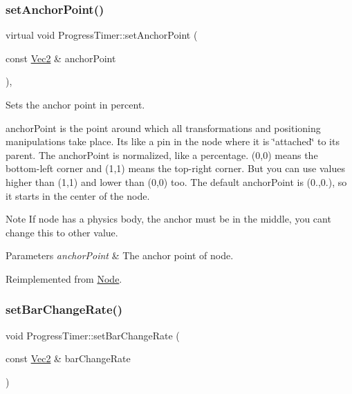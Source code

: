 \subsubsection{\texorpdfstring{set\+Anchor\+Point()}{setAnchorPoint()}\hspace{0.1cm}{\footnotesize\ttfamily [2/2]}}
{\footnotesize\ttfamily virtual void Progress\+Timer\+::set\+Anchor\+Point (\begin{DoxyParamCaption}\item[{const \hyperlink{classVec2}{Vec2} \&}]{anchor\+Point }\end{DoxyParamCaption})\hspace{0.3cm}{\ttfamily [override]}, {\ttfamily [virtual]}}

Sets the anchor point in percent.

anchor\+Point is the point around which all transformations and positioning manipulations take place. It\textquotesingle{}s like a pin in the node where it is \char`\"{}attached\char`\"{} to its parent. The anchor\+Point is normalized, like a percentage. (0,0) means the bottom-\/left corner and (1,1) means the top-\/right corner. But you can use values higher than (1,1) and lower than (0,0) too. The default anchor\+Point is (0.,0.), so it starts in the center of the node. \begin{DoxyNote}{Note}
If node has a physics body, the anchor must be in the middle, you can\textquotesingle{}t change this to other value.
\end{DoxyNote}

\begin{DoxyParams}{Parameters}
{\em anchor\+Point} & The anchor point of node. \\
\hline
\end{DoxyParams}


Reimplemented from \hyperlink{classNode_a4dd45cb48a51df7c257675f527e3f277}{Node}.

\mbox{\label{classProgressTimer_ac54f707a0291274c04e265b2898586d6}} 
\subsubsection{\texorpdfstring{set\+Bar\+Change\+Rate()}{setBarChangeRate()}\hspace{0.1cm}{\footnotesize\ttfamily [1/2]}}
{\footnotesize\ttfamily void Progress\+Timer\+::set\+Bar\+Change\+Rate (\begin{DoxyParamCaption}\item[{const \hyperlink{classVec2}{Vec2} \&}]{bar\+Change\+Rate }\end{DoxyParamCaption})\hspace{0.3cm}{\ttfamily [inline]}}

